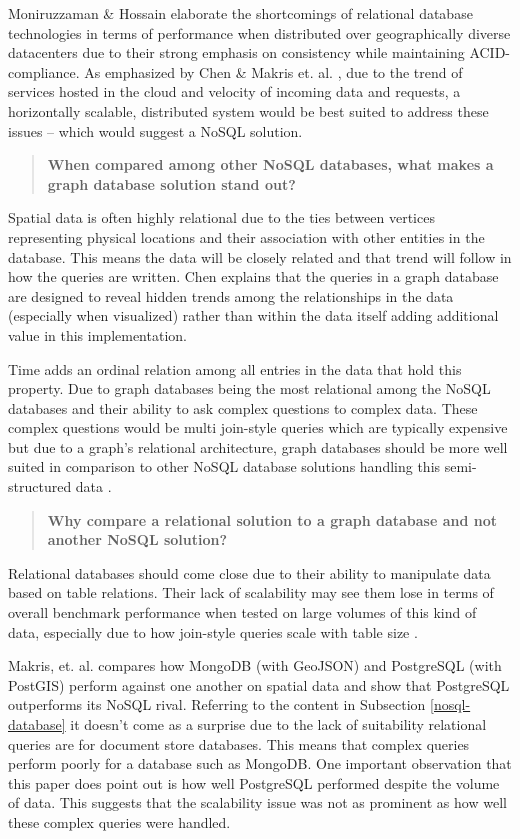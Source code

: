 Moniruzzaman \& Hossain \cite{nosql-db} elaborate the shortcomings of relational database technologies in terms of performance when distributed over geographically diverse datacenters due to their strong emphasis on consistency while maintaining ACID-compliance. As emphasized by Chen \cite{socialdata} \& Makris et. al. \cite{mongovspostgres}, due to the trend of services hosted in the cloud and velocity of incoming data and requests, a horizontally scalable, distributed system would be best suited to address these issues -- which would suggest a NoSQL solution.

\begin{quote}
    \textbf{When compared among other NoSQL databases, what makes a graph database solution stand out?}
\end{quote}

Spatial data is often highly relational due to the ties between vertices representing physical locations and their association with other entities in the database. This means the data will be closely related and that trend will follow in how the queries are written. Chen \cite{socialdata} explains that the queries in a graph database are designed to reveal hidden trends among the relationships in the data (especially when visualized) rather than within the data itself adding additional value in this implementation.

Time adds an ordinal relation among all entries in the data that hold this property. Due to graph databases being the most relational among the NoSQL databases and their ability to ask complex questions to complex data. These complex questions would be multi join-style queries which are typically expensive but due to a graph's relational architecture, graph databases should be more well suited in comparison to other NoSQL database solutions handling this semi-structured data \cite{data-in-nosql}.

\begin{quote}
    \textbf{Why compare a relational solution to a graph database and not another NoSQL solution?}
\end{quote}

Relational databases should come close due to their ability to manipulate data based on table relations. Their lack of scalability may see them lose in terms of overall benchmark performance when tested on large volumes of this kind of data, especially due to how join-style queries scale with table size \cite{data-in-nosql}.

Makris, et. al. \cite{mongovspostgres} compares how MongoDB (with GeoJSON) and PostgreSQL (with PostGIS) perform against one another on spatial data and show that PostgreSQL outperforms its NoSQL rival. Referring to the content in Subsection \ref{nosql-database} it doesn't come as a surprise due to the lack of suitability relational queries are for document store databases. This means that complex queries perform poorly for a database such as MongoDB. One important observation that this paper does point out is how well PostgreSQL performed despite the volume of data. This suggests that the scalability issue was not as prominent as how well these complex queries were handled.

